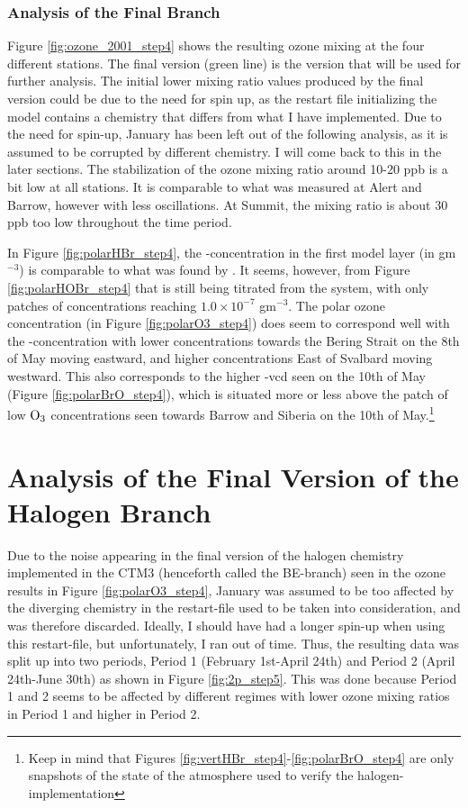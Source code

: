 \subsubsection{Analysis of the Final Branch}\label{sec:disc_finalBRanch}


Figure \ref{fig:ozone_2001_step4} shows the resulting ozone mixing at the four different stations. The final version (green line) is the version that will be used for further analysis. The initial lower mixing ratio values produced by the final version could be due to the need for spin up, as the restart file initializing the model contains a chemistry that differs from what I have implemented. Due to the need for spin-up, January has been left out of the following analysis, as it is assumed to be corrupted by different chemistry. I will come back to this in the later sections. The stabilization of the ozone mixing ratio around 10-20 ppb is a bit low at all stations. It is comparable to what was measured at Alert and Barrow, however with less oscillations. At Summit, the mixing ratio is about 30 ppb too low throughout the time period.


\medskip

In Figure \ref{fig:polarHBr_step4}, the -concentration in the first model layer (in gm$^{-3}$) is comparable to what was found by \cite{barrie}. It seems, however, from Figure \ref{fig:polarHOBr_step4} that  is still being titrated from the system, with only patches of concentrations reaching $1.0\times10^{-7}$ gm$^{-3}$. The polar ozone concentration (in Figure \ref{fig:polarO3_step4}) does seem to correspond well with the -concentration with lower concentrations towards the Bering Strait on the 8th of May moving eastward, and higher concentrations East of Svalbard moving westward. This also corresponds to the higher -vcd seen on the 10th of May (Figure \ref{fig:polarBrO_step4}), which is situated more or less above the patch of low $\mathrm{O_3}$ concentrations seen towards Barrow and Siberia on the 10th of May.\footnote{Keep in mind that Figures \ref{fig:vertHBr_step4}-\ref{fig:polarBrO_step4} are only snapshots of the state of the atmosphere used to verify the halogen-implementation}

\section{Analysis of the Final Version of the Halogen Branch}\label{sec:disc_final_Version}

Due to the noise appearing in the final version of the halogen chemistry implemented in the CTM3 (henceforth called the BE-branch) seen in the ozone results in Figure \ref{fig:polarO3_step4}, January was assumed to be too affected by the diverging chemistry in the restart-file used to be taken into consideration, and was therefore discarded. Ideally, I should have had a longer spin-up when using this restart-file, but unfortunately, I ran out of time. Thus, the resulting data was split up into two periods, Period 1 (February 1st-April 24th) and Period 2 (April 24th-June 30th) as shown in Figure \ref{fig:2p_step5}. This was done because Period 1 and 2 seems to be affected by different regimes with lower ozone mixing ratios in Period 1 and higher in Period 2.

